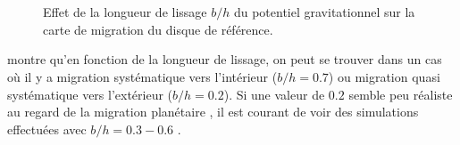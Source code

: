 \begin{figure}[htb]
\centering
{}\hfill
{}\\
\hfill
{}\\
\caption{Effet de la longueur de lissage $b/h$ du potentiel gravitationnel sur la carte de migration du disque de référence.
}\label{fig:migration_map_smoothing}
\end{figure}

 montre qu'en fonction de la longueur de lissage, on peut se trouver dans un cas où il y a
migration systématique vers l'intérieur ($b/h=0.7$) ou migration quasi systématique vers l'extérieur ($b/h=0.2$). Si une valeur
de $0.2$ semble peu réaliste au regard de la migration planétaire \citep{muller2012treating}, il est courant de voir des
simulations effectuées avec $b/h=0.3-0.6$ \citep{masset2002coorbital, devalborro2006comparative, paardekooper2009corotation}. 

